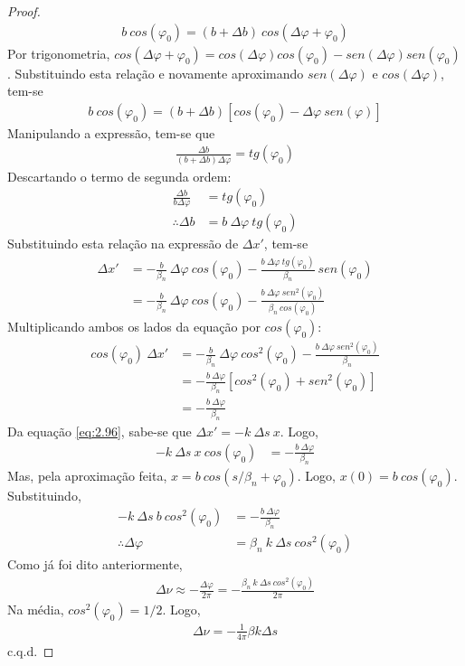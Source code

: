 \begin{proof}
	\begin{align*}
		b\ cos(\varphi_0) = (b+\Delta b)\ cos(\Delta \varphi + \varphi_0)
	\end{align*}
	Por trigonometria, $cos(\Delta \varphi + \varphi_0) = cos(\Delta \varphi)cos(\varphi_0) - sen(\Delta \varphi)sen(\varphi_0)$. Substituindo esta relação e novamente aproximando $sen(\Delta \varphi)$ e $cos(\Delta \varphi)$, tem-se
	\begin{align*}
		b\ cos(\varphi_0) = (b+\Delta b)[cos(\varphi_0)-\Delta \varphi\ sen(\varphi)]
	\end{align*}
	Manipulando a expressão, tem-se que
	\begin{align*}
		\frac{\Delta b}{(b+\Delta b)\Delta \varphi} = tg(\varphi_0)
	\end{align*}
	Descartando o termo de segunda ordem:
	\begin{align*}
		\frac{\Delta b}{b \Delta \varphi} &= tg(\varphi_0)\\
		\therefore \Delta b &= b\ \Delta \varphi\ tg(\varphi_0)
	\end{align*}
	Substituindo esta relação na expressão de $\Delta x'$, tem-se
	\begin{align*}
		\Delta x' &= -\frac{b}{\beta_n}\ \Delta \varphi\ cos(\varphi_0) - \frac{b\ \Delta \varphi\ tg(\varphi_0)}{\beta_n}\ sen(\varphi_0)\\
				  &= -\frac{b}{\beta_n}\ \Delta \varphi\ cos(\varphi_0) - \frac{b\ \Delta \varphi\ sen^2(\varphi_0)}{\beta_n\ cos(\varphi_0)}
	\end{align*}
	Multiplicando ambos os lados da equação por $cos(\varphi_0)$:
	\begin{align*}
		cos(\varphi_0)\ \Delta x' &= -\frac{b}{\beta_n}\ \Delta \varphi\ cos^2(\varphi_0) - \frac{b\ \Delta \varphi\ sen^2(\varphi_0)}{\beta_n}\\
			&= -\frac{b\ \Delta \varphi}{\beta_n}[cos^2(\varphi_0)+sen^2(\varphi_0)]\\
			&= -\frac{b\ \Delta \varphi}{\beta_n}
	\end{align*}
	Da equação \eqref{eq:2.96}, sabe-se que $\Delta x' = -k\ \Delta s\ x$. Logo,
	\begin{align*}
		-k\ \Delta s\ x\ cos(\varphi_0) &= -\frac{b\ \Delta \varphi}{\beta_n}
	\end{align*}
	Mas, pela aproximação feita, $x = b\ cos(s/\beta_n + \varphi_0)$. Logo, $x(0) = b\ cos(\varphi_0)$. Substituindo,
	\begin{align*}
		-k\ \Delta s\ b\ cos^2(\varphi_0) &= -\frac{b\ \Delta \varphi}{\beta_n}\\
		\therefore \Delta \varphi &= \beta_n\ k\ \Delta s\ cos^2(\varphi_0)
	\end{align*}
	Como já foi dito anteriormente,
	\begin{align*}
		\Delta \nu \approx - \frac{\Delta \varphi}{2\pi} = -\frac{\beta_n\ k\ \Delta s\ cos^2(\varphi_0)}{2\pi}
	\end{align*}
	Na média, $cos^2(\varphi_0) = 1/2$. Logo,
	\begin{align*}
		\Delta \nu = -\frac{1}{4\pi}\beta k \Delta s
	\end{align*}
	c.q.d.
\end{proof}

